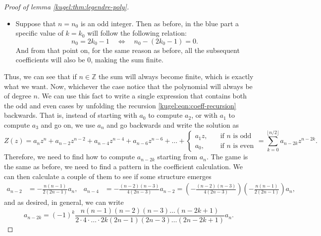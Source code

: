 \begin{proof}[Proof of lemma \ref{kugel:thm:legendre-poly}]
\begin{itemize}
    \item[\textcolor{blue!80!black}{\textbullet}]
      Suppose that $n=n_0$ is an odd integer. Then as before, in the blue part a
      specific value of $k=k_0$ will follow the following relation:
      \begin{equation*}
        n_0 = 2k_0 - 1
        \quad \iff \quad
        n_0-(2k_0-1)=0.
      \end{equation*}
      And from that point on, for the same reason as before, all the subsequent
      coefficients will also be 0, making the sum finite.
  \end{itemize} 

  Thus, we can see that if $n \in \mathbb{Z}$ the sum will always become finite,
  which is exactly what we want. Now, whichever the case notice that the
  polynomial will always be of degree $n$. We can use this fact to write a
  single expression that contains both the odd and even cases by unfolding the
  recursion \eqref{kugel:eqn:coeff-recursion} backwards. That is, instead of
  starting with $a_0$ to compute $a_2$, or with $a_1$ to compute $a_3$ and go
  on, we use $a_n$ and go backwards and write the solution as
  \begin{equation*}
    Z(z) = a_n z^n + a_{n-2} z^{n-2} + a_{n-4} z^{n-4} 
      + a_{n-6} z^{n-6} + \hdots +
      \begin{cases} 
        a_1 z, \quad &\text{if } n \text{ is odd} \\ 
        a_0, \quad  &\text{if } n \text{ is even} 
      \end{cases}
      = \sum_{k=0}^{\lfloor n/2 \rfloor} a_{n-2k}z^{n-2k}.
  \end{equation*}
  Therefore, we need to find how to compute $a_{n - 2k}$ starting from $a_n$.
  The game is the same as before, we need to find a pattern in the coefficient calculation. We can then calculate a couple of them to see if some structure emerges
  \begin{align*}
    a_{n-2} &= -\frac{n(n-1)}{2(2n-1)}a_n, &
    a_{n-4} &= -\frac{(n-2)(n-3)}{4(2n-3)}a_{n-2}
    = \left(
        -\frac{(n-2)(n-3)}{4(2n-3)}
      \right) \left(
        -\frac{n(n-1)}{2(2n-1)}
      \right) a_n,
  \end{align*}
  and as desired, in general, we can write
  \begin{equation*}
    a_{n-2k} = (-1)^k \frac{
      n(n-1)(n-2)(n-3) \hdots (n-2k+1)
    }{
      2 \cdot 4 \cdot \hdots \cdot 2k(2n-1)(2n-3) \hdots (2n-2k+1)
    } a_n.
  \end{equation*}

\end{proof}

